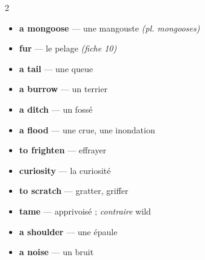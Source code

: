 \documentclass[troisieme]{fiche}
\begin{document}


\begin{multicols}{2}\small
\begin{itemize}[label=--,itemsep=0.8mm,leftmargin=*]
  \item \textbf{a mongoose} — une mangouste \textit{(pl. mongooses)}
  \item \textbf{fur} — le pelage \textit{(fiche 10)}
  \item \textbf{a tail} — une queue
  \item \textbf{a burrow} — un terrier
  \item \textbf{a ditch} — un fossé
  \item \textbf{a flood} — une crue, une inondation
  \item \textbf{to frighten} — effrayer
  \item \textbf{curiosity} — la curiosité
  \item \textbf{to scratch} — gratter, griffer
  \item \textbf{tame} — apprivoisé ; \textit{contraire} wild
  \item \textbf{a shoulder} — une épaule
  \item \textbf{a noise} — un bruit
\end{itemize}
\end{multicols}
\end{document}
